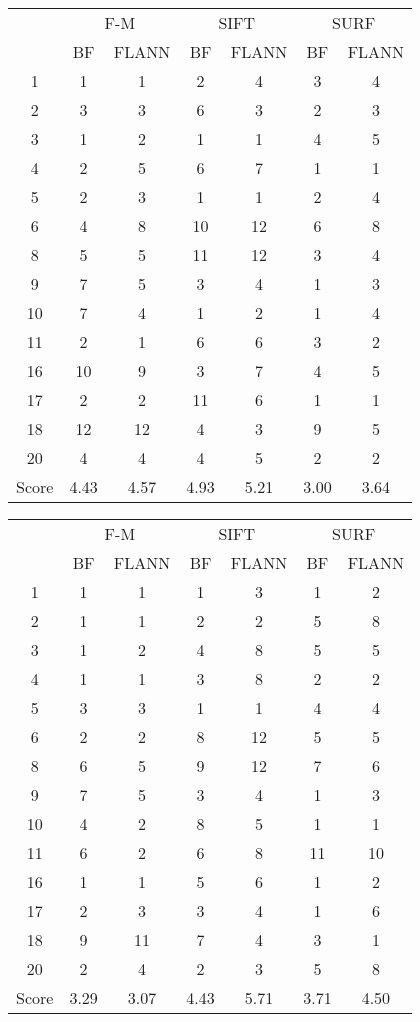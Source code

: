 \documentclass[draft,final]{vutinfth} %
\begin{document}
\begin{appendices}
\begin{minipage}{\linewidth}
\centering
\begin{tabular}{c|cc|cc|cc}
\multirow{2}{*}{ } & \multicolumn{2}{c}{ F-M } & \multicolumn{2}{c}{ SIFT } & \multicolumn{2}{c}{ SURF } \\
& BF & FLANN & BF & FLANN & BF & FLANN \\
\hline
1 & 1 & 1 & 2 & 4 & 3 & 4 \\
2 & 3 & 3 & 6 & 3 & 2 & 3 \\
3 & 1 & 2 & 1 & 1 & 4 & 5 \\
4 & 2 & 5 & 6 & 7 & 1 & 1 \\
5 & 2 & 3 & 1 & 1 & 2 & 4 \\
6 & 4 & 8 & 10 & 12 & 6 & 8 \\
8 & 5 & 5 & 11 & 12 & 3 & 4 \\
9 & 7 & 5 & 3 & 4 & 1 & 3 \\
10 & 7 & 4 & 1 & 2 & 1 & 4 \\
11 & 2 & 1 & 6 & 6 & 3 & 2 \\
16 & 10 & 9 & 3 & 7 & 4 & 5 \\
17 & 2 & 2 & 11 & 6 & 1 & 1 \\
18 & 12 & 12 & 4 & 3 & 9 & 5 \\
20 & 4 & 4 & 4 & 5 & 2 & 2 \\
\hline
Score & 4.43 & 4.57 & 4.93 & 5.21 & 3.00 & 3.64 \\
\end{tabular}

 \label{tab:20Mean} 
\end{minipage}

\begin{minipage}{\linewidth}
\centering
\begin{tabular}{c|cc|cc|cc}
\multirow{2}{*}{ } & \multicolumn{2}{c}{ F-M } & \multicolumn{2}{c}{ SIFT } & \multicolumn{2}{c}{ SURF } \\
& BF & FLANN & BF & FLANN & BF & FLANN \\
\hline
1 & 1 & 1 & 1 & 3 & 1 & 2 \\
2 & 1 & 1 & 2 & 2 & 5 & 8 \\
3 & 1 & 2 & 4 & 8 & 5 & 5 \\
4 & 1 & 1 & 3 & 8 & 2 & 2 \\
5 & 3 & 3 & 1 & 1 & 4 & 4 \\
6 & 2 & 2 & 8 & 12 & 5 & 5 \\
8 & 6 & 5 & 9 & 12 & 7 & 6 \\
9 & 7 & 5 & 3 & 4 & 1 & 3 \\
10 & 4 & 2 & 8 & 5 & 1 & 1 \\
11 & 6 & 2 & 6 & 8 & 11 & 10 \\
16 & 1 & 1 & 5 & 6 & 1 & 2 \\
17 & 2 & 3 & 3 & 4 & 1 & 6 \\
18 & 9 & 11 & 7 & 4 & 3 & 1 \\
20 & 2 & 4 & 2 & 3 & 5 & 8 \\
\hline
Score & 3.29 & 3.07 & 4.43 & 5.71 & 3.71 & 4.50 \\
\end{tabular}


\end{minipage}
\end{appendices}
\end{document}
